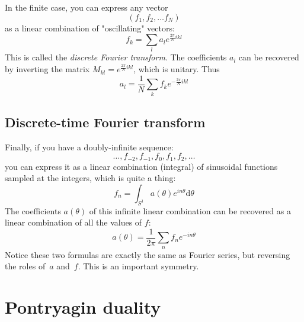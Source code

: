 In the finite case, you can express any vector
\begin{equation}
(f_1, f_2, \ldots f_N)
\end{equation}
as a linear combination of "oscillating" vectors:
\begin{equation}
f_k = \sum_l a_l e^{\frac{2\pi}{N}ikl}
\end{equation}
This is called the \emph{discrete Fourier transform}.
The coefficients $a_l$ can be recovered by inverting the matrix $M_{kl} =
e^{\frac{2\pi}{N}ikl}$, which is unitary.  Thus
$$
a_l = \frac{1}{N}\sum_k f_k e^{-\frac{2\pi}{N}ikl}
$$

\subsection{Discrete-time Fourier transform}

Finally, if you have a doubly-infinite sequence:
\begin{equation}
\ldots,f_{-2},f_{-1},f_0,f_1,f_2,\ldots
\end{equation}
you can express it as a linear combination (integral) of sinusoidal functions
sampled at the integers, which is quite a thing:
\begin{equation}
f_n = \int_{S^1} a(\theta) e^{in\theta}
\mathrm{d}\theta
\end{equation}
The coefficients $a(\theta)$ of this infinite linear combination can be
recovered as a linear combination of all the values of $f$:
\begin{equation}
	a(\theta) = \frac{1}{2\pi}\sum_n f_n e^{-in\theta}
\end{equation}
Notice these two formulas are exactly the same as Fourier series, but
reversing the roles of~$a$ and~$f$.
This is an important symmetry.



\section{Pontryagin duality}

